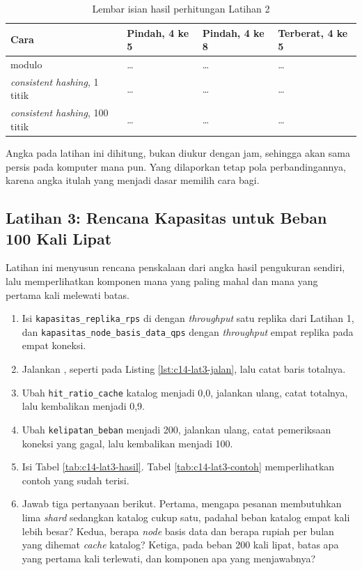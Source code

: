 \begin{table}[!htb]
  \centering
  \caption{Lembar isian hasil perhitungan Latihan 2}
  \label{tab:c14-lat2-hasil}
  \begin{tabularx}{\textwidth}{Xlll}
    \hline
    \textbf{Cara} & \textbf{Pindah, 4 ke 5} & \textbf{Pindah, 4 ke 8} & \textbf{Terberat, 4 ke 5} \\
    \hline
    modulo & \dots & \dots & \dots \\
    \hline
    \textit{consistent hashing}, 1 titik & \dots & \dots & \dots \\
    \hline
    \textit{consistent hashing}, 100 titik & \dots & \dots & \dots \\
    \hline
  \end{tabularx}
\end{table}

Angka pada latihan ini dihitung, bukan diukur dengan jam, sehingga akan sama
persis pada komputer mana pun. Yang dilaporkan tetap pola perbandingannya,
karena angka itulah yang menjadi dasar memilih cara bagi.

\subsection*{Latihan 3: Rencana Kapasitas untuk Beban 100 Kali Lipat}

Latihan ini menyusun rencana penskalaan dari angka hasil pengukuran sendiri,
lalu memperlihatkan komponen mana yang paling mahal dan mana yang pertama kali
melewati batas.

\begin{enumerate}
  \item Isi \texttt{kapasitas\_replika\_rps} di  dengan
        \textit{throughput} satu replika dari Latihan 1, dan
        \texttt{kapasitas\_node\_basis\_data\_qps} dengan
        \textit{throughput} empat replika pada empat koneksi.
  \item Jalankan , seperti pada Listing
        \ref{lst:c14-lat3-jalan}, lalu catat baris totalnya.
  \item Ubah \texttt{hit\_ratio\_cache} katalog menjadi 0,0, jalankan ulang,
        catat totalnya, lalu kembalikan menjadi 0,9.
  \item Ubah \texttt{kelipatan\_beban} menjadi 200, jalankan ulang, catat
        pemeriksaan koneksi yang gagal, lalu kembalikan menjadi 100.
  \item Isi Tabel \ref{tab:c14-lat3-hasil}. Tabel \ref{tab:c14-lat3-contoh}
        memperlihatkan contoh yang sudah terisi.
  \item Jawab tiga pertanyaan berikut. Pertama, mengapa pesanan membutuhkan
        lima \textit{shard} sedangkan katalog cukup satu, padahal beban
        katalog empat kali lebih besar? Kedua, berapa \textit{node} basis data dan
        berapa rupiah per bulan yang dihemat \textit{cache} katalog? Ketiga,
        pada beban 200 kali lipat, batas apa yang pertama kali terlewati, dan
        komponen apa yang menjawabnya?
\end{enumerate}

